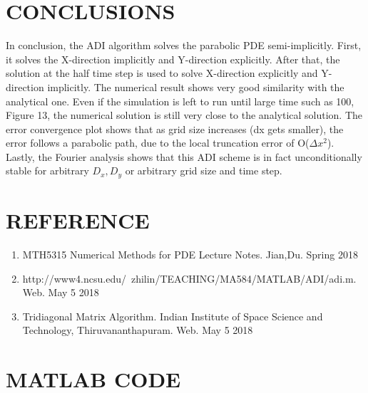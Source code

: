 \documentclass[12pt]{article}
\begin{document}
	\section{CONCLUSIONS}
	In conclusion, the ADI algorithm solves the parabolic PDE semi-implicitly. First, it solves the X-direction implicitly and Y-direction explicitly. After that, the solution at the half time step is used to solve X-direction explicitly and Y-direction implicitly. The numerical result shows very good similarity with the analytical one. Even if the simulation is left to run until large time such as 100, Figure 13, the numerical solution is still very close to the analytical solution. The error convergence plot shows that as grid size increases (dx gets smaller), the error follows a parabolic path, due to the local truncation error of O($\Delta x^2$). Lastly, the Fourier analysis shows that this ADI scheme is in fact unconditionally stable for arbitrary $D_x,D_y$ or arbitrary grid size and time step. 
	\newpage
	\section{REFERENCE}
	\begin{enumerate}
		\item MTH5315 Numerical Methods for PDE Lecture Notes. Jian,Du. Spring 2018
		\item http://www4.ncsu.edu/~zhilin/TEACHING/MA584/MATLAB/ADI/adi.m. Web. May 5 2018
		\item Tridiagonal Matrix Algorithm. Indian Institute of Space Science and Technology, Thiruvananthapuram. Web. May 5 2018
	\end{enumerate}
	\newpage
	\section{MATLAB CODE}
	
	
	
	
\end{document}
